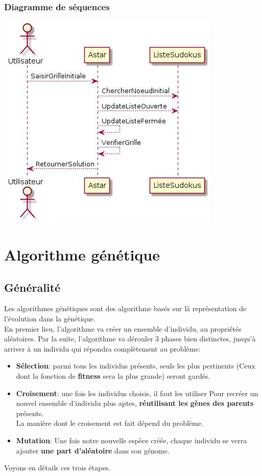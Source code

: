             \subsubsection{Diagramme de séquences}
                \begin{center}
                    \includegraphics[scale=0.5]{images/AstarDiagrammeSequences.png}
                \end{center}
    \section{Algorithme génétique}
        \subsection{Généralité}
            Les algorithmes génétiques sont des algorithme basés sur là représentation de l'évolution dans la génétique.\\
            En premier lieu, l'algorithme va créer un ensemble d'individu, au propriétés aléatoires.
            Par la suite, l'algorithme va dérouler 3 phases bien distinctes, jusqu'à arriver à un individu qui répondra complètement au problème: 
            \begin{itemize}
                \item \textbf{Sélection}: parmi tous les individus présents, seuls les plus pertinents (Ceux dont la fonction de \textbf{fitness} sera la plus grande) seront gardés.
                \item \textbf{Croisement}: une fois les individus choisis, il faut les utiliser Pour recréer un nouvel ensemble d'individu plus aptes, \textbf{réutilisant les gènes des parents} présents.\\
                    La manière dont le croisement est fait dépend du problème.
                \item \textbf{Mutation}: Une fois notre nouvelle espèce créée, chaque individu se verra ajouter \textbf{une part d'aléatoire} dans son génome.
            \end{itemize}
            Voyons en détails ces trois étapes.
